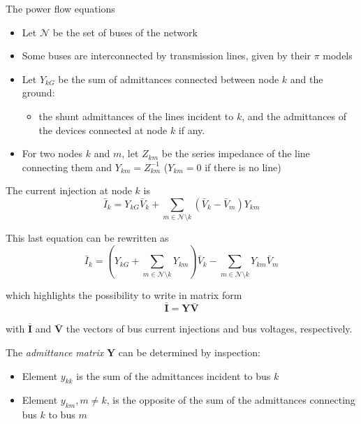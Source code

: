 \begin{frame}[allowframebreaks]{The power flow equations}
    \begin{itemize}
        \item Let $\mathcal{N}$ be the set of buses of the network
        \item Some buses are interconnected by transmission lines, given by their $\pi$ models
        \item Let $Y_{kG}$ be the sum of admittances connected between node $k$ and the ground:
        \begin{itemize}
            \item the shunt admittances of the lines incident to $k$, and the admittances of the devices connected at node $k$ if any.
        \end{itemize}
        \item For two nodes $k$ and $m$, let $Z_{km}$ be the series impedance of the line connecting them and $Y_{km} = Z_{km}^{-1}$ ($Y_{km} = 0$ if there is no line)
    \end{itemize}
    
    The current injection at node $k$ is
    \begin{equation}
        \bar{I}_k = Y_{kG} \bar{V}_k + \sum_{m \in \mathcal{N} \setminus k} {(\bar{V}_k - \bar{V}_m) Y_{km}} \label{eq:bus_inj}
    \end{equation}
   

    This last equation can be rewritten as
    $$\bar{I}_k =  \left(Y_{kG}+ \sum_{m \in \mathcal{N} \setminus k} Y_{km} \right) \bar{V}_k  - \sum_{m \in \mathcal{N} \setminus k} Y_{km} \bar{V}_m$$
    
    which highlights the possibility to write in matrix form
    \begin{equation}
        \mathbf{\bar{I}} = \mathbf{Y} \mathbf{\bar{V}} \label{eq:bus_inj_mat}
    \end{equation}
    
    with $\mathbf{\bar{I}}$ and $\mathbf{\bar{V}}$ the vectors of bus current injections and bus voltages, respectively.
    
    \vspace{1cm}
    
    The \textit{admittance matrix} $\mathbf{Y}$ can be determined by inspection:
    \begin{itemize}
        \item Element $y_{kk}$ is the sum of the admittances incident to bus $k$
        \item Element $y_{km}, m \neq k$, is the opposite of the sum of the admittances connecting bus $k$ to bus $m$
    \end{itemize}


\end{frame}
